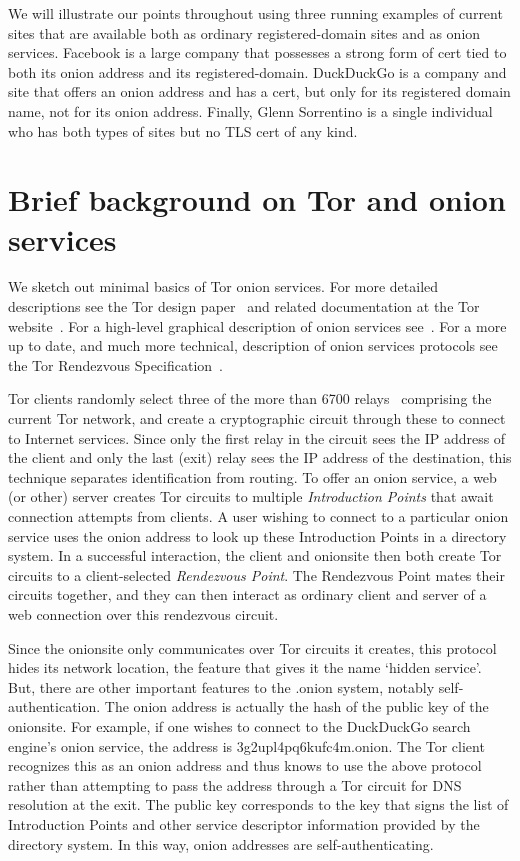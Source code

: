 \documentclass[10pt, conference, compsocconf]{styles/IEEEtran}
\begin{document}
We will illustrate our points throughout using three running examples
of current sites that are available both as ordinary registered-domain
sites and as onion services. Facebook is a large company that
possesses a strong form of cert tied to both its onion address and its
registered-domain. DuckDuckGo is a company and site that offers an
onion address and has a cert, but only for its registered domain name,
not for its onion address.  Finally, Glenn Sorrentino is a single
individual who has both types of sites but no TLS cert of any kind.

\section{Brief background on Tor and onion services}

We sketch out minimal basics of Tor onion services. For more detailed
descriptions see the Tor design paper~\cite{tor-design} and related documentation at the
Tor website~\cite{torproject}. For a high-level graphical description
of onion services see~\cite{tor-hs}. For a more up to date, and much
more technical, description of onion services protocols see the Tor
Rendezvous Specification~\cite{tor-rend-spec}.

Tor clients randomly select three of the more than 6700 relays~\cite{tor-network-size}
comprising the current Tor network, and create a cryptographic circuit
through these to connect to Internet services. Since only the first
relay in the circuit sees the IP address of the client and
only the last (exit) relay sees the IP address of the destination,
this technique separates identification from routing.
To offer an onion service, a web (or other) server creates Tor circuits to
multiple \emph{Introduction Points} that await connection attempts
from clients. A user wishing to connect to a particular onion service
uses the onion address to look up these Introduction Points in a
directory system. In a successful interaction, the client and
onionsite then both create Tor circuits to a client-selected
\emph{Rendezvous Point}. The Rendezvous Point mates their circuits
together, and they can then interact as ordinary client and server of
a web connection over this rendezvous circuit.

Since the onionsite only communicates over Tor circuits it creates,
this protocol hides its network location, the feature that
gives it the name `hidden service'. But, there are other important
features to the .onion system, notably self-authentication. The onion
address is actually the hash of the public key of the onionsite. For
example, if one wishes to connect to the DuckDuckGo search engine's
onion service, the address is 3g2upl4pq6kufc4m.onion. The Tor client
recognizes this as an onion address and thus knows to use the above
protocol rather than attempting to pass the address through a Tor
circuit for DNS resolution at the exit. The public key
corresponds to the key that signs the list of Introduction Points
and other service descriptor information provided by the directory
system. In this way, onion addresses are self-authenticating.
\end{document}
